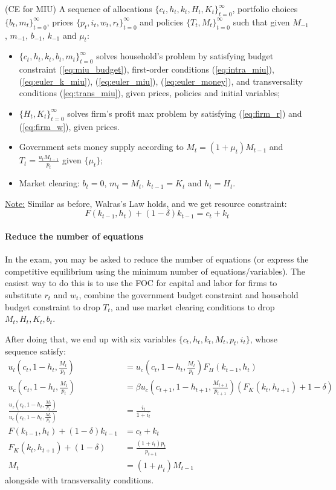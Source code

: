 \documentclass[12pt]{article}
\begin{document}
\begin{definition} (CE for MIU)
	A sequence of allocations $\{c_t, h_t, k_t, H_t, K_t\}_{t=0}^\infty$, portfolio choices $\{b_t, m_t\}_{t=0}^\infty$, prices $\{p_t, i_t, w_t, r_t\}_{t=0}^\infty$ and policies $\{T_t, M_t\}_{t=0}^\infty$ such that given $M_{-1}$, $m_{-1}$, $b_{-1}$, $k_{-1}$ and $\mu_t$:
	\begin{itemize}
		\item $\{c_t, h_t, k_t, b_t, m_t\}_{t=0}^\infty$ solves household's problem by satisfying budget constraint (\ref{eq:miu_budget}), first-order conditions (\ref{eq:intra_miu}), (\ref{eq:euler_k_miu}), (\ref{eq:euler_miu}), (\ref{eq:euler_money}), and transversality conditions (\ref{eq:trans_miu}), given prices, policies and initial variables;
		\item $\{H_t, K_t\}_{t=0}^\infty$ solves firm's profit max problem by satisfying (\ref{eq:firm_r}) and (\ref{eq:firm_w}), given prices.
		\item Government sets money supply according to $M_t = (1+\mu_t)M_{t-1}$ and $T_t = \frac{u_t M_{t-1}}{p_t}$ given  $\{\mu_t\}$;
		\item Market clearing: $b_t = 0$, $m_t = M_t$, $k_{t-1} = K_t$ and $h_t = H_t$.
	\end{itemize}
\end{definition}

\underline{Note:} Similar as before, Walras's Law holds, and we get resource constraint:
\begin{equation}
	F(k_{t-1}, h_t) + (1-\delta)k_{t-1} = c_t + k_t
\end{equation}

\paragraph{Reduce the number of equations}
In the exam, you may be asked to reduce the number of equations (or express the competitive equilibrium using the minimum number of equations/variables). The easiest way to do this is to use the FOC for capital and labor for firms to substitute $r_t$ and $w_t$, combine the government budget constraint and household budget constraint to drop $T_t$, and use market clearing conditions to drop $M_t, H_t, K_t, b_t$.

After doing that, we end up with six variables $\{c_t, h_t, k_t, M_t, p_t, i_t\}$, whose sequence satisfy:
\begin{align}
	u_l(c_t, 1-h_t, \frac{M_t}{p_t}) &= u_c(c_t, 1-h_t, \frac{M_t}{p_t})F_H(k_{t-1}, h_t)\\
	u_c(c_t, 1-h_t, \frac{M_t}{p_t}) &= \beta u_c(c_{t+1}, 1-h_{t+1}, \frac{M_{t+1}}{p_{t+1}})(F_K(k_t, h_{t+1}) + 1 - \delta)\\
	\frac{u_z(c_t, 1-h_t, \frac{M_t}{p_t})}{u_c(c_t, 1-h_t, \frac{M_t}{p_t})} &= \frac{i_t}{1+i_t}\\
	F(k_{t-1}, h_t) + (1-\delta)k_{t-1} &= c_t + k_t\\
	F_K(k_t, h_{t+1}) + (1-\delta) &= \frac{(1+i_t)p_t}{p_{t+1}}\\
	M_t &= (1+\mu_t) M_{t-1}
\end{align}
alongside with transversality conditions.
\end{document}
